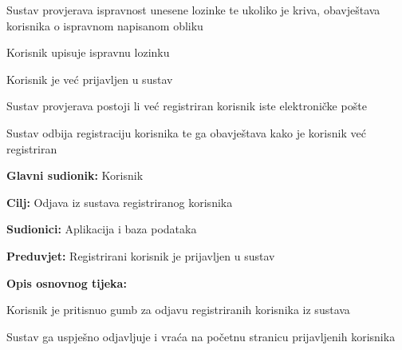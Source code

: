 \begin{packed_item}
\begin{packed_item}
\begin{packed_enum}
							\item Sustav provjerava ispravnost unesene lozinke te ukoliko je kriva, obavještava korisnika o ispravnom napisanom obliku
							\item Korisnik upisuje ispravnu lozinku
							
						\end{packed_enum}
						
						\item[4.a] Korisnik je već prijavljen u sustav
						\item[] \begin{packed_enum}
							
							\item Sustav provjerava postoji li već registriran korisnik iste elektroničke pošte
							\item Sustav odbija registraciju korisnika te ga obavještava kako je korisnik već registriran 
							
						\end{packed_enum}
						
					\end{packed_item}
				\end{packed_item}
				
				
				
				\noindent {}
				\begin{packed_item}
					
					\item \textbf{Glavni sudionik: }Korisnik
					\item  \textbf{Cilj:} Odjava iz sustava registriranog korisnika
					\item  \textbf{Sudionici:} Aplikacija i baza podataka
					\item  \textbf{Preduvjet:} Registrirani korisnik je prijavljen u sustav
					\item  \textbf{Opis osnovnog tijeka:}
					
					\item[] \begin{packed_enum}
						
						\item Korisnik je pritisnuo gumb za odjavu registriranih korisnika iz sustava 
						\item Sustav ga uspješno odjavljuje i vraća na početnu stranicu prijavljenih korisnika
						
					\end{packed_enum}
					
				\end{packed_item}
				
